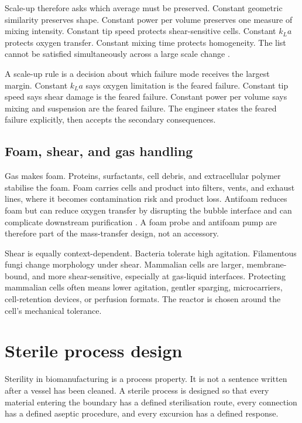 Scale-up therefore asks which average must be preserved. Constant
geometric similarity preserves shape. Constant power per volume
preserves one measure of mixing intensity. Constant tip speed protects
shear-sensitive cells. Constant $k_L a$ protects oxygen transfer.
Constant mixing time protects homogeneity. The list cannot be satisfied
simultaneously across a large scale change
\cite[ch.~10]{text:v6c10-doran-bioprocess-2013}.

\begin{principle}
A scale-up rule is a decision about which failure mode receives the
largest margin. Constant $k_L a$ says oxygen limitation is the feared
failure. Constant tip speed says shear damage is the feared failure.
Constant power per volume says mixing and suspension are the feared
failure. The engineer states the feared failure explicitly, then accepts
the secondary consequences.
\end{principle}

\subsection{Foam, shear, and gas handling}

Gas makes foam. Proteins, surfactants, cell debris, and extracellular
polymer stabilise the foam. Foam carries cells and product into filters,
vents, and exhaust lines, where it becomes contamination risk and
product loss. Antifoam reduces foam but can reduce oxygen transfer by
disrupting the bubble interface and can complicate downstream
purification \cite{paper:v6c10-bell-fermenter-foam-2014}. A foam probe
and antifoam pump are therefore part of the mass-transfer design, not
an accessory.

Shear is equally context-dependent. Bacteria tolerate high agitation.
Filamentous fungi change morphology under shear. Mammalian cells are
larger, membrane-bound, and more shear-sensitive, especially at gas-liquid
interfaces. Protecting mammalian cells often means lower agitation,
gentler sparging, microcarriers, cell-retention devices, or perfusion
formats. The reactor is chosen around the cell's mechanical tolerance.

\section{Sterile process design}

Sterility in biomanufacturing is a process property. It is not a
sentence written after a vessel has been cleaned. A sterile process is
designed so that every material entering the boundary has a defined
sterilisation route, every connection has a defined aseptic procedure,
and every excursion has a defined response.


